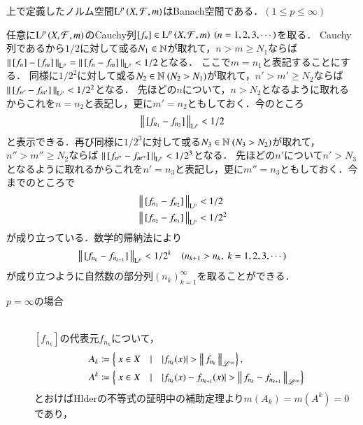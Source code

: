 \begin{qst}
\begin{prp}
	上で定義したノルム空間$\operatorname{L}^{p} \left(X,\mathcal{F},m\right)$はBanach空間である．$(1 \leq p \leq \infty)$
\end{prp}
\begin{prf}
	任意に$\operatorname{L}^{p} \left(X,\mathcal{F},m\right)$のCauchy列$[f_n] \in \Lp{p}{X,\mathcal{F},m}\ (n=1,2,3,\cdots)$を取る．
	Cauchy列であるから$1/2$に対して或る$N_1 \in \mathbb{N}$が取れて，$n>m \geq N_1$ならば
	$\left\|\, [f_n]-[f_m]\, \right\|_{\mathrm{L}^p} = \left\|\, [f_n - f_m]\, \right\|_{\mathrm{L}^p} < 1/2$となる．
	ここで$m = n_1$と表記することにする．
	同様に$1/2^2$に対して或る$N_2 \in \mathbb{N}\ (N_2 > N_1)$が取れて，$n'>m' \geq N_2$ならば
	$\left\|\, [f_{n'} - f_{m'}]\, \right\|_{\mathrm{L}^p} < 1/2^2$となる．
	先ほどの$n$について，$n > N_2$となるように取れるからこれを$n = n_2$と表記し，更に$m' = n_2$ともしておく．今のところ
	\begin{align}
		\left\|\, [f_{n_1} - f_{n_2}]\, \right\|_{\mathrm{L}^p} < 1/2
	\end{align}
	と表示できる．再び同様に$1/2^3$に対して或る$N_3 \in \mathbb{N}\ (N_3 > N_2)$が取れて，$n''>m'' \geq N_2$ならば
	$\left\|\, [f_{n''} - f_{m''}]\, \right\|_{\mathrm{L}^p} < 1/2^3$となる．
	先ほどの$n'$について$n' > N_3$となるように取れるからこれを$n' = n_3$と表記し，更に$m'' = n_3$ともしておく．今までのところで
	\begin{align}
		&\left\|\, [f_{n_1} - f_{n_2}]\, \right\|_{\mathrm{L}^p} < 1/2 \\
		&\left\|\, [f_{n_2} - f_{n_3}]\, \right\|_{\mathrm{L}^p} < 1/2^2
	\end{align}
	が成り立っている．数学的帰納法により
	\begin{align}
		\left\|\, [f_{n_k} - f_{n_{k+1}}]\, \right\|_{\mathrm{L}^p} < 1/2^k \quad (n_{k+1} > n_k,\ k=1,2,3,\cdots) \label{ineq:Lp_banach_2}
	\end{align}
	が成り立つように自然数の部分列$(n_k)_{k=1}^{\infty}$を取ることができる．
	\begin{description}
		\item[$p = \infty$の場合]\mbox{}\\
			$[f_{n_k}]$の代表元$f_{n_k}$について，
			\begin{align}
				A_k &\coloneqq \left\{\ x \in X\quad |\quad |f_{n_k}(x)| > \left\|\, f_{n_k}\, \right\|_{\mathscr{L}^\infty} \right\}, \\
				A^k &\coloneqq \left\{\ x \in X\quad |\quad |f_{n_k}(x) - f_{n_{k+1}}(x)| > \left\|\, f_{n_k} - f_{n_{k+1}}\, \right\|_{\mathscr{L}^\infty} \right\}
			\end{align}
			とおけばHlderの不等式の証明中の補助定理より$m(A_k) = m(A^k) = 0$であり，
			\begin{align}

\end{align}
\end{description}
\end{prf}
\end{qst}
